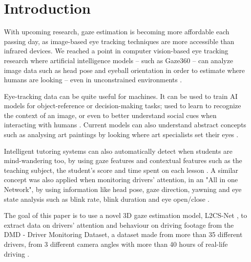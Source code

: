 \chapter{Introduction}

With upcoming research, gaze estimation is becoming more affordable each passing day, as image-based eye tracking techniques are more accessible than infrared devices. We reached a point in computer vision-based eye tracking research where artificial intelligence models -- such as Gaze360 -- can analyze image data such as head pose and eyeball orientation in order to estimate where humans are looking -- even in unconstrained environments \cite{gaze360_2019}. 

Eye-tracking data can be quite useful for machines. It can be used to train AI models for object-reference or decision-making tasks; used to learn to recognize the context of an image, or even to better understand social cues when interacting with humans \cite{ijcai2020-689}. Current models can also understand abstract concepts such as analysing art paintings by looking where art specialists set their eyes \cite{Massaro2012-jx}.

Intelligent tutoring systems can also automatically detect when students are mind-wandering too, by using gaze features and contextual features such as the teaching subject, the student's score and time spent on each lesson \cite{Hutt2016TheEH}. A similar concept was also applied when monitoring drivers' attention, in an "All in one Network", by using information like head pose, gaze direction, yawning and eye state analysis such as blink rate, blink duration and eye open/close \cite{9053659}.



The goal of this paper is to use a novel 3D gaze estimation model, L2CS-Net \cite{https://doi.org/10.48550/arxiv.2203.03339}, to extract data on drivers' attention and behaviour on driving footage from the DMD - Driver Monitoring Dataset, a dataset made from more than 35 different drivers, from 3 different camera angles with more than 40 hours of real-life driving \cite{jOrtega2020}.